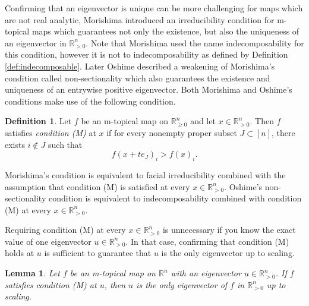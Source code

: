 \documentclass[10pt,reqno]{amsart}
\newcommand{\R}{\mathbb{R}}
\theoremstyle{plain}
\newtheorem{lemma}[theorem]{Lemma}
\theoremstyle{definition}
\newtheorem{definition}[theorem]{Definition}
\numberwithin{equation}{section}
\begin{document}
Confirming that an eigenvector is unique can be more challenging for maps which are not real analytic, Morishima \cite{Morishima64} introduced an irreducibility condition for m-topical maps which guarantees not only the existence, but also the uniqueness of an eigenvector in $\R^n_{>0}$. Note that Morishima used the name indecomposability for this condition, however it is not to indecomposability as defined by Definition \ref{def:indecomposable}.   Later Oshime \cite{Oshime83} described a weakening of Morishima's condition called non-sectionality which also guarantees the existence and uniqueness of an entrywise positive eigenvector. Both Morishima and Oshime's conditions make use of the following condition. 

\begin{definition}
Let $f$ be an m-topical map on $\R^n_{\ge 0}$ and let $x \in \R^n_{>0}$.  Then $f$ satisfies \emph{condition (M)} at $x$ if for every nonempty proper subset $J \subset [n]$, there exists $i \notin J$ such that
$$f(x+t e_J)_i > f(x)_i.$$
\end{definition}

Morishima's condition is equivalent to facial irreducibility combined with the assumption that condition (M) is satisfied at every $x \in \R^n_{>0}$. Oshime's non-sectionality condition is equivalent to indecomposability combined with condition (M) at every $x \in \R^n_{>0}$.  %

Requiring condition (M) at every $x \in \R^n_{>0}$ is unnecessary if you know the exact value of one eigenvector $u \in \R^n_{>0}$. In that case, confirming that condition (M) holds at $u$ is sufficient to guarantee that $u$ is the only eigenvector up to scaling.  

\begin{lemma} \label{lem:condM}
Let $f$ be an m-topical map on $\R^n$ with an eigenvector $u \in \R^n_{>0}$.  If $f$ satisfies condition (M) at $u$, then $u$ is the only eigenvector of $f$ in $\R^n_{>0}$ up to scaling.  
\end{lemma}
\end{document}
